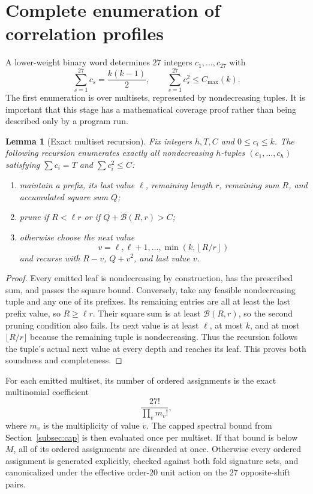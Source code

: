 \documentclass[11pt,a4paper]{article}
\newtheorem{lemma}[theorem]{Lemma}
\theoremstyle{definition}
\theoremstyle{remark}
\begin{document}
\section{Complete enumeration of correlation profiles}
\label{sec:corrprofiles}

A lower-weight binary word determines $27$ integers
$c_1,\ldots,c_{27}$ with
\[
 \sum_{s=1}^{27}c_s=\frac{k(k-1)}2,
 \qquad
 \sum_{s=1}^{27}c_s^2\le C_{\max}(k).
\]
The first enumeration is over multisets, represented by nondecreasing tuples.
It is important that this stage has a mathematical coverage proof rather than
being described only by a program run.

\begin{lemma}[Exact multiset recursion]
\label{lem:multiset-recursion}
Fix integers $h,T,C$ and $0\le c_i\le k$.  The following recursion enumerates
exactly all nondecreasing $h$-tuples $(c_1,\ldots,c_h)$ satisfying
$\sum c_i=T$ and $\sum c_i^2\le C$:
\begin{enumerate}[leftmargin=2.4em,itemsep=2pt]
\item maintain a prefix, its last value $\ell$, remaining length $r$, remaining
sum $R$, and accumulated square sum $Q$;
\item prune if $R<\ell r$ or if
$Q+\mathcal B(R,r)>C$;
\item otherwise choose the next value
\[
  v=\ell,\ell+1,\ldots,
  \min\!\left(k,\left\lfloor R/r\right\rfloor\right)
\]
and recurse with $R-v$, $Q+v^2$, and last value $v$.
\end{enumerate}
\end{lemma}

\begin{proof}
Every emitted leaf is nondecreasing by construction, has the prescribed sum,
and passes the square bound.  Conversely, take any feasible nondecreasing
tuple and any one of its prefixes.  Its remaining entries are all at least the
last prefix value, so $R\ge\ell r$.  Their square sum is at least
$\mathcal B(R,r)$, so the second pruning condition also fails.  Its next value
is at least $\ell$, at most $k$, and at most $\lfloor R/r\rfloor$ because the
remaining tuple is nondecreasing.  Thus the recursion follows the tuple's
actual next value at every depth and reaches its leaf.  This proves both
soundness and completeness.
\end{proof}

For each emitted multiset, its number of ordered assignments is the exact
multinomial coefficient
\[
  \frac{27!}{\prod_v m_v!},
\]
where $m_v$ is the multiplicity of value $v$.  The capped spectral bound from
Section~\ref{subsec:cap} is then evaluated once per multiset.  If that bound is
below $M$, all of its ordered assignments are discarded at once.  Otherwise
every ordered assignment is generated explicitly, checked against both fold
signature sets, and canonicalized under the effective order-$20$ unit action
on the $27$ opposite-shift pairs.
\end{document}
